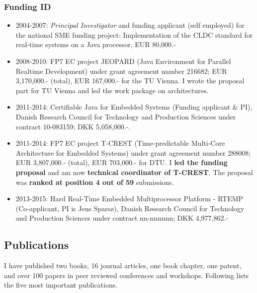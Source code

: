 \documentclass[%
    a4paper,
    12pt, %
    headinclude, footexclude,
    notitlepage,
    headsepline,
    pointlessnumbers,
    ]{scrartcl}
\begin{document}
\subsubsection*{Funding ID}

\begin{itemize}
  \item 2004-2007: \emph{Principal Investigator} and funding
      applicant (self employed) for the national SME funding
      project: Implementation of the CLDC standard for real-time
      systems on a Java processor, EUR 80,000.-

  \item 2008-2010: FP7 EC project JEOPARD (Java Environment for
      Parallel Realtime Development) under grant agreement number
      216682; EUR 3,170,000.- (total), EUR 167,000.- for the TU
      Vienna. I wrote the proposal part for TU Vienna and 
      led the work package on architectures. 
      
   \item 2011-2014: Certifiable Java for Embedded Systems (Funding applicant \& PI),
   Danish Research Council for Technology and Production
   Sciences under contract 10-083159; DKK 5,058,000.-.
     
  \item 2011-2014: FP7 EC project T-CREST (Time-predictable
  Multi-Core Architecture for Embedded Systems) under grant
  agreement number 288008; EUR 3,807,000.- (total), EUR 703,000.- for DTU.
  I \textbf{led the funding proposal} and am now \textbf{technical coordinator of T-CREST}.
  The proposal was \textbf{ranked at position 4 out of 59} submissions.
  
  
  \item 2013-2015: Hard Real-Time Embedded Multiprocessor Platform - RTEMP
  (Co-applicant, PI is Jens Spars{\o}), 
  Danish Research Council for Technology and Production
  Sciences under contract nn-nnnnnn; DKK 4,977,862.-
\end{itemize}



\subsection*{Publications}

I have published two books, 16 journal articles, one book chapter, one patent, and over 100
papers in peer reviewed conferences and workshops. Following lists the five most important
publications.
\end{document}
